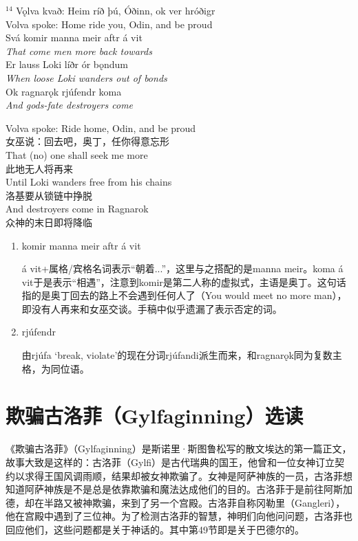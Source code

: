 \begin{paracol}{2}
  \noindent
  $^{14}$ Vǫlva kvað: Heim ríð þú, Óðinn, ok ver hróðigr\\
  Volva spoke: Home ride you, Odin, and be proud\\
  Svá komir manna meir aftr á vit\\
  \textit{That come men more back towards}\\
  Er lauss Loki líðr ór bǫndum\\
  \textit{When loose Loki wanders out of bonds} \\
  Ok ragnarǫk rjúfendr koma\\
  \textit{And gods-fate destroyers come}

  \switchcolumn
  \noindent
  Volva spoke: Ride home, Odin, and be proud\\
  女巫说：回去吧，奥丁，任你得意忘形\\
  That (no) one shall seek me more\\
  此地无人将再来\\
  Until Loki wanders free from his chains\\
  洛基要从锁链中挣脱\\
  And destroyers come in Ragnarok\\
  众神的末日即将降临
\end{paracol}
\begin{grammar*}{}
  \begin{enumerate}[leftmargin=*]
    \item komir manna meir aftr á vit

          á vit+属格/宾格名词表示“朝着...”，这里与之搭配的是manna meir。koma á vit于是表示“相遇”，注意到komir是第二人称的虚拟式，主语是奥丁。这句话指的是奥丁回去的路上不会遇到任何人了（You would meet no more man），即没有人再来和女巫交谈。手稿中似乎遗漏了表示否定的词。

    \item rjúfendr

          由rjúfa `break, violate'的现在分词rjúfandi派生而来，和ragnarǫk同为复数主格，为同位语。

  \end{enumerate}
\end{grammar*}
\section{欺骗古洛菲（Gylfaginning）选读}
《欺骗古洛菲》（Gylfaginning）是斯诺里·斯图鲁松写的散文埃达的第一篇正文，故事大致是这样的：古洛菲（Gylfi）是古代瑞典的国王，他曾和一位女神订立契约以求得王国风调雨顺，结果却被女神欺骗了。女神是阿萨神族的一员，古洛菲想知道阿萨神族是不是总是依靠欺骗和魔法达成他们的目的。古洛菲于是前往阿斯加德，却在半路又被神欺骗，来到了另一个宫殿。古洛菲自称冈勒里（Gangleri），他在宫殿中遇到了三位神。为了检测古洛菲的智慧，神明们向他问问题，古洛菲也回应他们，这些问题都是关于神话的。其中第49节即是关于巴德尔的。

